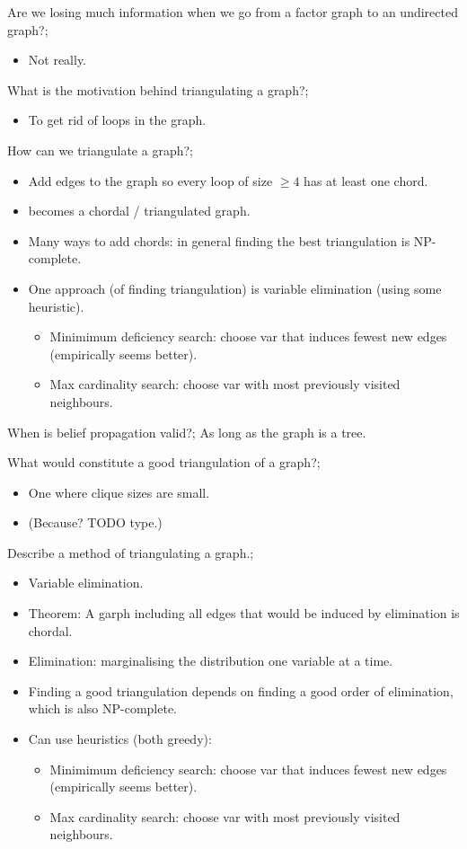 \documentclass{article}
\begin{document}
Are we losing much information when we go from a factor graph to an undirected graph?; \begin{itemize} \item Not really.  \end{itemize}

What is the motivation behind triangulating a graph?; \begin{itemize} \item To get rid of loops in the graph.  \end{itemize}

How can we triangulate a graph?; \begin{itemize} \item Add edges to the graph so every loop of size $\geq 4$ has at least one chord.  \item becomes a chordal / triangulated graph.  \item Many ways to add chords: in general finding the best triangulation is NP-complete.  \item One approach (of finding triangulation) is variable elimination (using some heuristic).  \begin{itemize} \item Minimimum deficiency search: choose var that induces fewest new edges (empirically seems better).  \item Max cardinality search: choose var with most previously visited neighbours.  \end{itemize} \end{itemize}

When is belief propagation valid?; As long as the graph is a tree.

What would constitute a good triangulation of a graph?; \begin{itemize} \item One where clique sizes are small.  \item (Because? TODO type.) \end{itemize}

Describe a method of triangulating a graph.; \begin{itemize} \item Variable elimination.  \item Theorem: A garph including all edges that would be induced by elimination is chordal.  \item Elimination: marginalising the distribution one variable at a time.  \item Finding a good triangulation depends on finding a good order of elimination, which is also NP-complete.  \item Can use heuristics (both greedy): \begin{itemize} \item Minimimum deficiency search: choose var that induces fewest new edges (empirically seems better).  \item Max cardinality search: choose var with most previously visited neighbours.  \end{itemize} \end{itemize}
\end{document}
